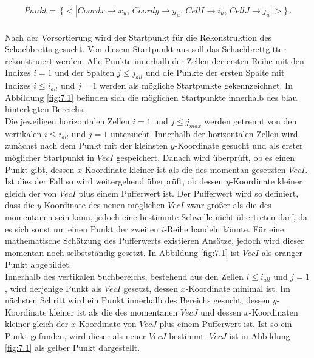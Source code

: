 \begin{gather*}
	Punkt = \, \{<|Coordx \rightarrow x_u,\, Coordy \rightarrow y_u,\, CellI \rightarrow i_u,\, CellJ \rightarrow j_u |>\} \, .
\end{gather*} \\


Nach der Vorsortierung wird der Startpunkt für die Rekonstruktion des Schachbretts gesucht. Von diesem Startpunkt aus soll das Schachbrettgitter rekonstruiert werden. Alle Punkte innerhalb der Zellen der ersten Reihe mit den Indizes $i = 1$ und der Spalten $j \leq  j_{all}$ und die Punkte der ersten Spalte mit Indizes $i \leq i_{all}$ und $j = 1$ werden als mögliche Startpunkte gekennzeichnet. In Abbildung \ref{fig:7.1} befinden sich die möglichen Startpunkte innerhalb des blau hinterlegten Bereichs.\\


Die jeweiligen horizontalen Zellen $i = 1$ und $j \leq  j_{max}$ werden getrennt von den vertikalen $i \leq i_{all}$ und $j = 1$ untersucht. Innerhalb der horizontalen Zellen wird zunächst nach dem Punkt mit der kleinsten $y$-Koordinate gesucht und als erster möglicher Startpunkt in $VecI$ gespeichert. Danach wird überprüft, ob es einen Punkt gibt, dessen $x$-Koordinate kleiner ist als die des momentan gesetzten $VecI$. Ist dies der Fall so wird weitergehend überprüft, ob dessen $y$-Koordinate kleiner gleich der von $VecI$ plus einem Pufferwert ist. Der Pufferwert wird so definiert, dass die $y$-Koordinate des neuen möglichen $VecI$ zwar größer als die des momentanen sein kann, jedoch eine bestimmte Schwelle nicht übertreten darf, da es sich sonst um einen Punkt der zweiten $i$-Reihe handeln könnte. Für eine mathematische Schätzung des Pufferwerts existieren Ansätze, jedoch wird dieser momentan noch selbstständig gesetzt. In Abbildung \ref{fig:7.1} ist $VecI$ als oranger Punkt abgebildet.\\

Innerhalb des vertikalen Suchbereichs, bestehend aus den Zellen  $i \leq i_{all}$ und $j = 1$, wird derjenige Punkt als $VecI$ gesetzt, dessen $x$-Koordinate minimal ist. Im nächsten Schritt wird ein Punkt innerhalb des Bereichs gesucht, dessen $y$-Koordinate kleiner ist als die des momentanen $VecJ$ und dessen $x$-Koordinaten kleiner gleich der $x$-Koordinate von $VecJ$ plus einem Pufferwert ist. Ist so ein Punkt gefunden, wird dieser als neuer $VecJ$ bestimmt. $VecJ$ ist in Abbildung \ref{fig:7.1} als gelber Punkt dargestellt.\\


